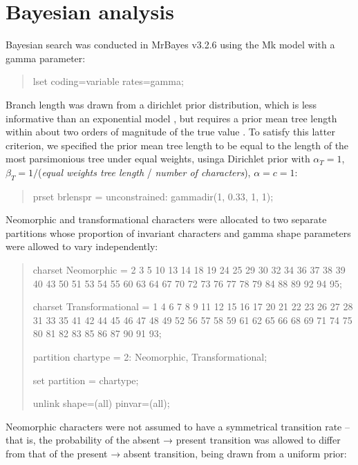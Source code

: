 \documentclass[]{book}
\theoremstyle{definition}
\theoremstyle{definition}
\theoremstyle{definition}
\theoremstyle{remark}
\begin{document}
\hypertarget{bayesian-analysis}{%
\chapter{Bayesian analysis}\label{bayesian-analysis}}

Bayesian search was conducted in MrBayes v3.2.6 \citep{Ronquist2012}
using the Mk model \citep{Lewis2001} with a gamma parameter:

\begin{quote}
lset coding=variable rates=gamma;
\end{quote}

Branch length was drawn from a dirichlet prior distribution, which is
less informative than an exponential model \citep{Rannala2012}, but
requires a prior mean tree length within about two orders of magnitude
of the true value \citep{Zhang2012}. To satisfy this latter criterion,
we specified the prior mean tree length to be equal to the length of the
most parsimonious tree under equal weights, usinga Dirichlet prior with
\(α_T = 1\), \(β_T = 1/\)(\emph{equal weights tree length} /
\emph{number of characters}), \(α = c = 1\):

\begin{quote}
prset brlenspr = unconstrained: gammadir(1, 0.33, 1, 1);
\end{quote}

Neomorphic and transformational characters \citep[sensu][]{Sereno2007}
were allocated to two separate partitions whose proportion of invariant
characters and gamma shape parameters were allowed to vary
independently:

\begin{quote}
charset Neomorphic = 2 3 5 10 13 14 18 19 24 25 29 30 32 34 36 37 38 39
40 43 50 51 53 54 55 60 63 64 67 70 72 73 76 77 78 79 84 88 89 92 94 95;

charset Transformational = 1 4 6 7 8 9 11 12 15 16 17 20 21 22 23 26 27
28 31 33 35 41 42 44 45 46 47 48 49 52 56 57 58 59 61 62 65 66 68 69 71
74 75 80 81 82 83 85 86 87 90 91 93;

partition chartype = 2: Neomorphic, Transformational;

set partition = chartype;

unlink shape=(all) pinvar=(all);
\end{quote}

Neomorphic characters were not assumed to have a symmetrical transition
rate -- that is, the probability of the absent → present transition was
allowed to differ from that of the present → absent transition, being
drawn from a uniform prior:
\end{document}
